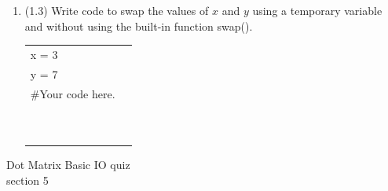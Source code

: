 \documentclass{article}
\begin{document}
\begin{enumerate}

\item (1.3) 
		Write code to swap the values of $x$ and $y$ using a temporary variable and without using
		the built-in function swap().\\		
		\begin{tabular}{|ll}
			\\			
			x = 3\\
			y = 7\\[5pt]
			\#Your code here. \\[5pt]
			& \\ & \\ & \\ & \\ & \\ & \\ & \\ & \\ & \\ & \\ 
		\end{tabular}



\end{enumerate}
\pagebreak
Dot Matrix \hfill Basic IO quiz\\
section 5\\
\end{document}
